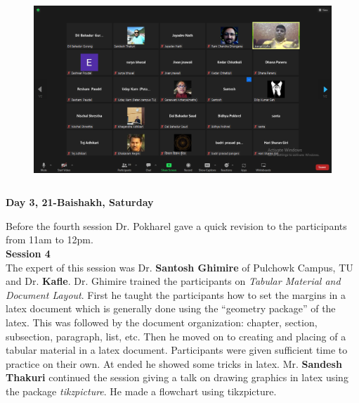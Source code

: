 \documentclass[a4paper,12pt]{report}
\begin{document}
\begin{figure}[h!]
  \centering
  \includegraphics[height=7cm, width=15cm]{online3.png}
\end{figure}
\clearpage


\begin{center}
  {\bfseries \Large Day 3, 21-Baishakh, Saturday}
\end{center}
\vspace{3mm}

Before the fourth session Dr. Pokharel gave a quick revision to the participants from 11am to 12pm.\\

{\bfseries \large Session 4}\\[3mm]
The expert of this session was Dr. \textbf{Santosh Ghimire} of Pulchowk Campus, TU and Dr. \textbf{Kafle}. Dr. Ghimire trained the participants on \textit{Tabular Material and Document Layout}. First he taught the participants how to set the margins in a latex document which is generally done using the ``geometry package'' of the latex. This was followed by the document organization: chapter, section, subsection, paragraph, list, etc. Then he moved on to creating and placing of a tabular material in a latex document. Participants were given sufficient time to practice on their own. At ended he showed some tricks in latex. Mr. \textbf{Sandesh Thakuri} continued the session giving a talk on drawing graphics in latex using the package \textit{tikzpicture}. He made a flowchart using tikzpicture.
\vspace{7mm}
\end{document}

